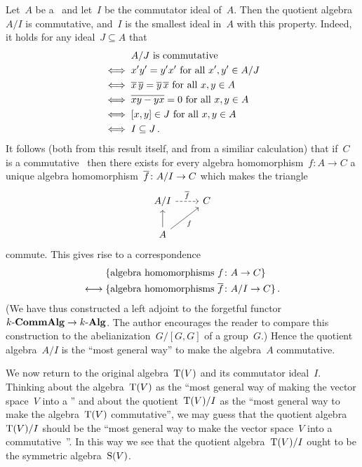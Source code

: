 \begin{remark}
  Let~$A$ be a~{\kalg} and let~$I$ be the commutator ideal of~$A$.
  Then the quotient algebra~$A/I$ is commutative, and~$I$ is the smallest ideal in~$A$ with this property.
  Indeed, it holds for any {\twosided} ideal~$J \subseteq A$ that
  \begin{align*}
        {}& \text{$A/J$ is commutative} \\
    \iff{}& \text{$x' y' = y' x'$ for all~$x', y' \in A/J$} \\
    \iff{}& \text{$\overline{x} \, \overline{y} = \overline{y} \, \overline{x}$ for all~$x, y \in A$} \\
    \iff{}& \text{$\overline{xy - yx} = 0$ for all~$x, y \in A$} \\
    \iff{}& \text{$[x,y] \in J$ for all~$x, y \in A$} \\
    \iff{}& I \subseteq J \,.
  \end{align*}
  It follows (both from this result itself, and from a similiar calculation) that if~$C$ is a commutative~{\kalg} then there exists for every algebra homomorphism~$f \colon A \to C$ a unique algebra homomorphism~$\overline{f} \colon A/I \to C$ which makes the triangle
  \[
    \begin{tikzcd}
        A/I
        \arrow[dashed]{r}[above]{\induced{f}}
      & C
      \\
        A
        \arrow{u}
        \arrow{ur}[below right]{f}
      & {}
    \end{tikzcd}
  \]
  commute.
  This gives rise to a {\onetoone} correspondence
  \begin{align*}
      {}&\{ \text{algebra homomorphisms~$f \colon A \to C$} \}  \\
    \longleftrightarrow{}&
      \{ \text{algebra homomorphisms~$\overline{f} \colon A/I \to C$} \} \,.
  \end{align*}
  (We have thus constructed a left adjoint to the forgetful functor~$\text{$k$-$\mathbf{CommAlg}$} \to \text{$k$-$\mathbf{Alg}$}$.
  The author encourages the reader to compare this construction to the abelianization~$G/[G,G]$ of a group~$G$.)
  Hence the quotient algebra~$A/I$ is the \enquote{most general way} to make the algebra~$A$ commutative.
\end{remark}

We now return to the original algebra~$\operatorname{T}(V)$ and its commutator ideal~$I$.
Thinking about the algebra~$\operatorname{T}(V)$ as the \enquote{most general way of making the vector space~$V$ into a {\kalg}} and about the quotient~$\operatorname{T}(V)/I$ as the \enquote{most general way to make the algebra~$\operatorname{T}(V)$ commutative}, we may guess that the quotient algebra~$\operatorname{T}(V)/I$ should be the \enquote{most general way to make the vector space~$V$ into a commutative~{\kalg}}.
In this way we see that the quotient algebra~$\operatorname{T}(V)/I$ ought to be the symmetric algebra~$\operatorname{S}(V)$.

